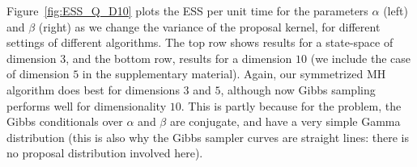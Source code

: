{  %
  Figure~\ref{fig:ESS_Q_D10} plots the ESS 
  per unit time for the parameters $\alpha$ (left) and $\beta$ (right) as we 
  change the variance of the proposal kernel, for different settings of
  different algorithms. The top row shows results for a state-space
  of dimension $3$, and the bottom row, results for a dimension
  $10$ (we include the case of dimension $5$ in the supplementary material).
  Again, our symmetrized  MH algorithm does best for dimensions
  $3$ and $5$, although now Gibbs sampling performs well for dimensionality $10$.
  This is partly because for the problem, the Gibbs conditionals over $\alpha$
  and $\beta$ are conjugate, and have a very simple Gamma distribution
  (this is also why the Gibbs sampler curves are straight lines: there is no
  proposal distribution involved here).
}
